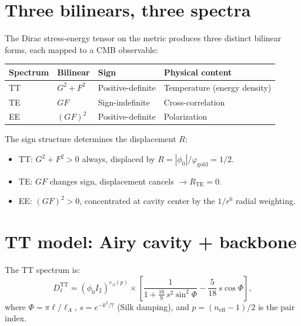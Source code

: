 \documentclass[11pt,letterpaper]{article}
\numberwithin{equation}{section}
\begin{document}
\section{Three bilinears, three spectra}
\label{sec:bilinears}

The Dirac stress-energy tensor on the metric produces three distinct
bilinear forms, each mapped to a CMB observable:

\begin{center}
\begin{tabular}{llll}
\toprule
Spectrum & Bilinear & Sign & Physical content \\
\midrule
TT & $G^2 + F^2$ & Positive-definite & Temperature (energy density) \\
TE & $GF$ & Sign-indefinite & Cross-correlation \\
EE & $(GF)^2$ & Positive-definite & Polarization \\
\bottomrule
\end{tabular}
\end{center}

The sign structure determines the displacement $R$:
\begin{itemize}
  \item TT: $G^2 + F^2 > 0$ always, displaced by $R = |\phi_0|/\varphi_\mathrm{gold} = 1/2$.
  \item TE: $GF$ changes sign, displacement cancels $\to R_\mathrm{TE} = 0$.
  \item EE: $(GF)^2 > 0$, concentrated at cavity center by the
    $1/r^6$ radial weighting.
\end{itemize}

\section{TT model: Airy cavity + backbone}
\label{sec:tt}

The TT spectrum is:
\begin{equation}\label{eq:tt}
  D_\ell^\mathrm{TT} = (\phi_0 I_2)^{c_A(p)}
  \times \left[\frac{1}{1 + \frac{16}{9}\,s^2\sin^2\Phi}
  - \frac{5}{18}\,s\cos\Phi\right],
\end{equation}
where $\Phi = \pi\ell/\ell_A$, $s = e^{-k^2/7}$ (Silk damping), and
$p = (n_\mathrm{eff} - 1)/2$ is the pair index.
\end{document}

